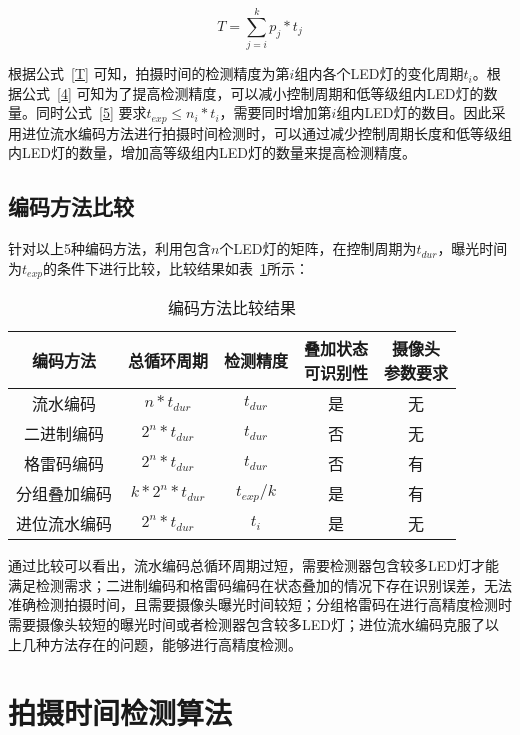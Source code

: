 \begin{equation}
T = \sum_{j=i}^k p_j * t_j
  \label{T}
\end{equation}

根据公式~\ref{T} 可知，拍摄时间的检测精度为第$i$组内各个LED灯的变化周期$t_i$。根据公式~\ref{4} 可知为了提高检测精度，可以减小控制周期和低等级组内LED灯的数量。同时公式~\ref{5} 要求$t_{exp} \le n_i * t_i$，需要同时增加第$i$组内LED灯的数目。因此采用进位流水编码方法进行拍摄时间检测时，可以通过减少控制周期长度和低等级组内LED灯的数量，增加高等级组内LED灯的数量来提高检测精度。

\subsection{编码方法比较}

针对以上5种编码方法，利用包含$n$个LED灯的矩阵，在控制周期为$t_{dur}$，曝光时间为$t_{exp}$的条件下进行比较，比较结果如表~\ref{comp}所示：

\begin{table}[h]
  \centering
  \caption{编码方法比较结果} 
  \label{comp}
  \begin{tabular}{c|c|c|c|c}\hline
  编码方法 & 总循环周期 & 检测精度 & \tabincell{c}{叠加状态\\可识别性}  & \tabincell{c}{摄像头\\参数要求} \\ \hline
  流水编码 & $n * t_{dur}$ & $t_{dur}$ & 是 & 无\\ \hline
  二进制编码 & $2^n * t_{dur}$ & $t_{dur}$ & 否 & 无 \\ \hline
  格雷码编码 & $2^n * t_{dur}$ & $t_{dur}$ & 否 & 有 \\ \hline
  分组叠加编码 & $k * 2 ^ n * t_{dur}$ & $t_{exp} / k$ & 是 & 有 \\ \hline
  进位流水编码 & $2^n * t_{dur}$ & $t_i$ & 是 & 无 \\ \hline
  \end{tabular}
\end{table}

通过比较可以看出，流水编码总循环周期过短，需要检测器包含较多LED灯才能满足检测需求；二进制编码和格雷码编码在状态叠加的情况下存在识别误差，无法准确检测拍摄时间，且需要摄像头曝光时间较短；分组格雷码在进行高精度检测时需要摄像头较短的曝光时间或者检测器包含较多LED灯；进位流水编码克服了以上几种方法存在的问题，能够进行高精度检测。

\section{拍摄时间检测算法}
\label{detecSe}

